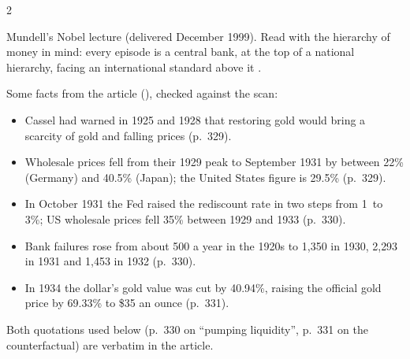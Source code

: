 \begin{paracol}{2}
\begin{nfigure}
\caption{Mundell's 20th century in three acts, with the dates used in the lecture .}\label{fig:intl-acts}
\end{nfigure}

\begin{reading}
Mundell's Nobel lecture (delivered December 1999). Read with the hierarchy of money in mind: every episode is a central bank, at the top of a national
hierarchy, facing an international standard above it .

Some facts from the article (), checked against the scan:
\begin{itemize}
  \item Cassel had warned in 1925 and 1928 that restoring gold would bring a scarcity of gold and falling prices (p.~329).
  \item Wholesale prices fell from their 1929 peak to September 1931 by between 22\% (Germany) and 40.5\% (Japan); the United States figure is 29.5\% (p.~329).
  \item In October 1931 the Fed raised the rediscount rate in two steps from 1\textonehalf\ to 3\textonehalf\%; US wholesale prices fell 35\% between 1929 and 1933 (p.~330).
  \item Bank failures rose from about 500 a year in the 1920s to 1{,}350 in 1930, 2{,}293 in 1931 and 1{,}453 in 1932 (p.~330).
  \item In 1934 the dollar's gold value was cut by 40.94\%, raising the official gold price by 69.33\% to \$35 an ounce (p.~331).
\end{itemize}
Both quotations used below (p.~330 on ``pumping liquidity'', p.~331 on the counterfactual) are verbatim in the article.
\end{reading}


\end{paracol}
